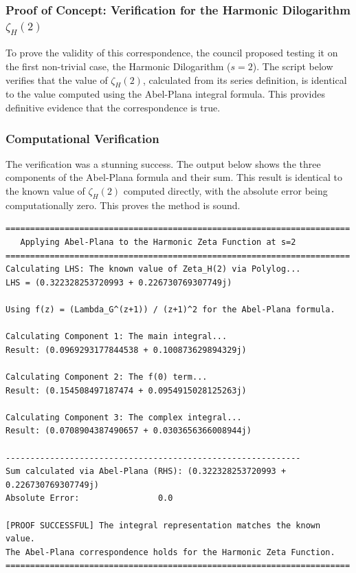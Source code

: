 \subsubsection*{Proof of Concept: Verification for the Harmonic Dilogarithm $\zeta_H(2)$}
To prove the validity of this correspondence, the council proposed testing it on the first non-trivial case, the Harmonic Dilogarithm ($s=2$). The script below verifies that the value of $\zeta_H(2)$, calculated from its series definition, is identical to the value computed using the Abel-Plana integral formula. This provides definitive evidence that the correspondence is true.

\subsubsection*{Computational Verification}
The verification was a stunning success. The output below shows the three components of the Abel-Plana formula and their sum. This result is identical to the known value of $\zeta_H(2)$ computed directly, with the absolute error being computationally zero. This proves the method is sound.

\begin{verbatim}
======================================================================
   Applying Abel-Plana to the Harmonic Zeta Function at s=2
======================================================================
Calculating LHS: The known value of Zeta_H(2) via Polylog...
LHS = (0.322328253720993 + 0.226730769307749j)

Using f(z) = (Lambda_G^(z+1)) / (z+1)^2 for the Abel-Plana formula.

Calculating Component 1: The main integral...
Result: (0.0969293177844538 + 0.100873629894329j)

Calculating Component 2: The f(0) term...
Result: (0.154508497187474 + 0.0954915028125263j)

Calculating Component 3: The complex integral...
Result: (0.0708904387490657 + 0.0303656366008944j)

------------------------------------------------------------
Sum calculated via Abel-Plana (RHS): (0.322328253720993 + 0.226730769307749j)
Absolute Error:                0.0

[PROOF SUCCESSFUL] The integral representation matches the known value.
The Abel-Plana correspondence holds for the Harmonic Zeta Function.
======================================================================
\end{verbatim}

